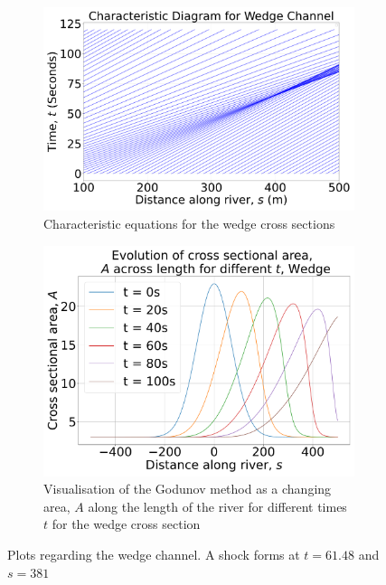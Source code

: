 \documentclass[12pt]{article}
\begin{document}
\begin{figure}[h]
    \centering
    \begin{subfigure}[b]{0.49\textwidth}
        \centering
        \includegraphics[width=\textwidth]{Figures/Wedge_characteristic.pdf}
        \caption{Characteristic equations for the wedge cross sections}
        \label{fig:wedge_char}
    \end{subfigure}
    \hfill
    \begin{subfigure}[b]{0.49\textwidth}
        \centering
        \includegraphics[width=\textwidth]{Figures/Wedge_godunov.pdf}
        \caption{Visualisation of the Godunov method as a changing area, $A$ along the length of the river for different times $t$ for the wedge cross section}
        \label{fig:wedge_godunov}
    \end{subfigure}
    \caption{Plots regarding the wedge channel. A shock forms at $t = 61.48$ and $s = 381$}
\end{figure}
\end{document}

